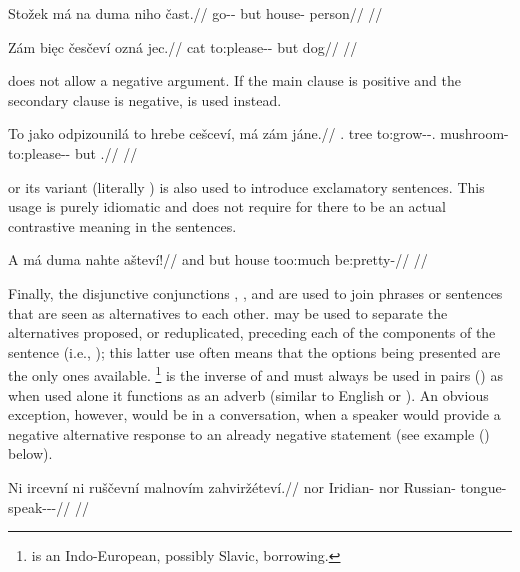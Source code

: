 \pex
\begingl
\gla Stožek má na duma niho čast.//
\glb go-\Av{}-\Pf{} but \Loc{} house-\Acc{}  person//
\glft {}//
\endgl
\xe


\pex[tag=ozna]
\begingl
\gla Zám bi\k{e}c česčeví ozná jec.//
\glb \Neg{} cat to:please-\Av{}-\Cont{} but dog//
\glft {}//
\endgl
\xe

 does not allow a negative argument. If the main
clause is positive and the secondary clause is negative,  is used
instead.

\pex
\begingl
\gla To jako odpizounilá to hrebe cešceví, má zám jáne.//
\glb \Dem{}.\Prox{} tree to:grow-\Loc{}-\Subj{}.\Ipf{} \Rz{} mushroom-\Acc{} to:please-\Av{}-\Cont{} but \Neg{} \Dem{}.\Med{}//
\glft {}//
\endgl
\xe

 or its variant  (literally ) is also used to
introduce exclamatory sentences. This usage is purely idiomatic and does not
require for there to be an actual contrastive meaning in the sentences.

\pex
\begingl
\gla A má duma nahte ašteví!// \glb and but house too:much be:pretty-\Cont{}//
\glft {}//
\endgl
\xe

Finally, the disjunctive conjunctions ,
, and  are used to join phrases or sentences that are seen as
alternatives to each other.  may be used to separate the
alternatives proposed, or reduplicated, preceding each of the components of the
sentence (i.e., ); this latter use often means
that the options being presented are the only ones available.
\footnote{ is an Indo-European, possibly Slavic,
borrowing.} is the inverse of  and must
always be used in pairs () as when used alone
it functions as an adverb (similar to English  or ).
An obvious exception, however, would be in a conversation, when a speaker would
provide a negative alternative response to an already negative statement (see
example () below).

\pex
\begingl
\gla Ni ircevní ni ruščevní malnovím zahviržéteví.//
\glb nor Iridian-\Att{} nor Russian-\Att{} tongue-\Ins{} speak-\Av{}-\Pot{}-\Cont{}//
\glft {}//
\endgl
\xe

